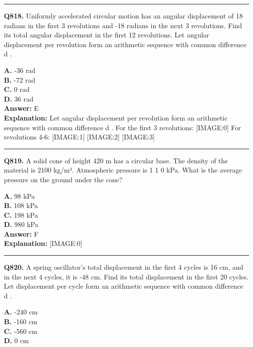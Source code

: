 \documentclass[12pt]{article}
\begin{document}
\hrule
\vspace{1em}


\noindent
\textbf{Q818.} Uniformly accelerated circular motion has an angular displacement of 18 radians in the first 3 revolutions and -18 radians in the next 3 revolutions. Find its total angular displacement in the first 12 revolutions.
Let angular displacement per revolution form an arithmetic sequence with common difference
d
.



\textbf{A.} -36 rad \\
\textbf{B.} -72 rad \\
\textbf{C.} 0 rad \\
\textbf{D.} 36 rad \\

\textbf{Answer:} E \\
\textbf{Explanation:} Let angular displacement per revolution form an arithmetic sequence with common difference
d
. For the first 3 revolutions:
[IMAGE:0]
For revolutions 4-6:
[IMAGE:1]
[IMAGE:2]
[IMAGE:3]

\hrule
\vspace{1em}


\noindent
\textbf{Q819.} A solid cone of height 420 m has a circular base. The density of the material is 2100 kg/m³. Atmospheric pressure is 1
1
0 kPa. What is the average pressure on the ground under the cone?



\textbf{A.} 98 kPa \\
\textbf{B.} 108 kPa \\
\textbf{C.} 198 kPa \\
\textbf{D.} 980 kPa \\

\textbf{Answer:} F \\
\textbf{Explanation:} [IMAGE:0]

\hrule
\vspace{1em}


\noindent
\textbf{Q820.} A spring oscillator's total displacement in the first 4 cycles is 16 cm, and in the next 4 cycles, it is -48 cm. Find its total displacement in the first 20 cycles.
Let displacement per cycle form an arithmetic sequence with common difference
d
.



\textbf{A.} -240 cm \\
\textbf{B.} -160 cm \\
\textbf{C.} -560 cm \\
\textbf{D.} 0 cm \\
\end{document}
